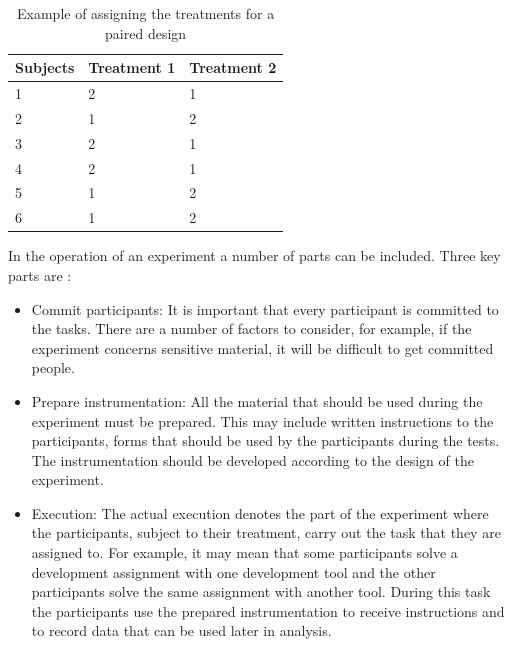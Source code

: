 \begin{table}[]
\centering
\caption{Example of assigning the treatments for a paired design}
\label{tab:paired}
\begin{tabular}{|l|l|l|}
\hline
\rowcolor[HTML]{FFCCC9} 
\textbf{Subjects} & \textbf{Treatment 1} & \textbf{Treatment 2} \\ \hline
1                 & 2                    & 1                    \\ \hline
2                 & 1                    & 2                    \\ \hline
3                 & 2                    & 1                    \\ \hline
4                 & 2                    & 1                    \\ \hline
5                 & 1                    & 2                    \\ \hline
6                 & 1                    & 2                    \\ \hline
\end{tabular}
\end{table}

In the operation of an experiment a number of parts can be included. Three key parts are \cite{Wohlin2003}:
\begin{itemize}
\item Commit participants: It is important that every participant is committed to the tasks. There are a number of factors to consider, for example, if the experiment
concerns sensitive material, it will be difficult to get committed people.
\item Prepare instrumentation: All the material that should be used during the experiment must be prepared. This may include written instructions to the participants, forms that should be used by the participants during the tests. The instrumentation should be developed according to the design of the experiment. 
\item Execution: The actual execution denotes the part of the experiment where the participants, subject to their treatment, carry out the task that they are assigned to.
For example, it may mean that some participants solve a development assignment with one development tool and the other participants solve the same assignment with another tool. During this task the participants use the prepared instrumentation to receive instructions and to record data that can be used later in analysis.
\end{itemize}

